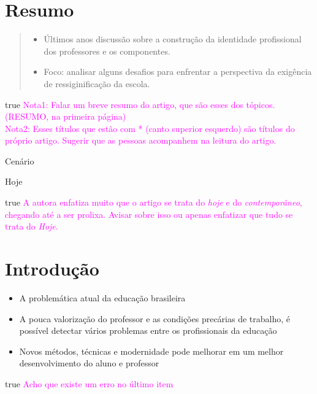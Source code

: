 \documentclass[]{beamer}
\newcommand{\obs}[1]{{
  \ifdefined\DRAFT
    \textcolor{magenta}{#1}
  \fi
}}
\def\DRAFT{true}
\begin{document}
  \section{Resumo}

  \begin{frame}{\secname *}
    \blockquote[{\cite[
      Ser professor/a hoje: novos confrontos entre saberes, culturas e práticas
    ]{vera_maria_ferrao_candau_ser_2014}}]{
      \begin{itemize}
        \item
          Últimos anos discussão sobre a construção da identidade profissional
          dos professores e os componentes.

        \item
          Foco: analisar alguns desafios para enfrentar a perspectiva da
          exigência de ressiginificação da escola.
      \end{itemize}
    }

    \obs{
      Nota1: Falar um breve resumo do artigo, que são esses dos tópicos.
      (RESUMO, na primeira página) \\
      Nota2: Esses títulos que estão com * (canto superior esquerdo) são
      títulos do próprio artigo. Sugerir que as pessoas acompanhem na leitura
      do artigo.
    }
  \end{frame}

  \begin{frame}{Cenário}
    \begin{center}
      \Huge Hoje
    \end{center}

    \obs{
      A autora enfatiza muito que o artigo se trata do \emph{hoje} e do
      \emph{contemporâneo}, chegando até a ser prolixa. Avisar sobre isso ou
      apenas enfatizar que tudo se trata do \emph{Hoje}.
    }
  \end{frame}

  \section{Introdução}

  \begin{frame}{\secname *}
    \begin{itemize}
      \item
        A problemática atual da educação brasileira

      \item
        A pouca valorização do professor e as condições precárias de trabalho, é
        possível detectar vários problemas entre os profissionais da educação

      \item
        Novos métodos, técnicas e modernidade pode melhorar em um melhor
        desenvolvimento do aluno e professor
    \end{itemize}

    \obs{
      Acho que existe um erro no último item
    }
  \end{frame}
\end{document}
